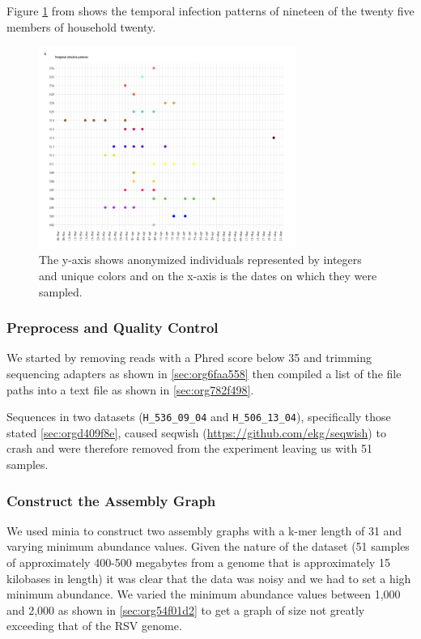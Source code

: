 \documentclass[10pt, a4paper]{article}
\begin{document}
Figure \ref{fig:orgbba1b9e} from
\cite{githinjiAssessingUtilityMinority2018} shows the temporal infection patterns
of nineteen of the twenty five members of household twenty.

\begin{figure}[h]
\centering
\includegraphics[width=0.75\textwidth]{../Figures/RSV/Githinji_HH_5_temporal_distribution.png}
\caption[Temporal Distribution of RSV Sample Collection]{\label{fig:orgbba1b9e}The y-axis shows anonymized individuals represented by integers and unique colors and on the x-axis is the dates on which they were sampled.}
\end{figure}

\subsubsection{Preprocess and Quality Control}
\label{sec:org2b20197}
We started by removing reads with a Phred score below 35 and trimming sequencing
adapters as shown in \ref{sec:org6faa558} then compiled a list 
of the file paths into a text file as shown in \ref{sec:org782f498}.

Sequences in two datasets (\texttt{H\_536\_09\_04} and \texttt{H\_506\_13\_04}), specifically those 
stated \ref{sec:orgd409f8e}, caused seqwish
(\url{https://github.com/ekg/seqwish}) to crash and were therefore removed from the 
experiment leaving us with 51 samples.

\subsubsection{Construct the Assembly Graph}
\label{sec:orgaf2a392}
We used minia \cite{chikhiSpaceefficientExactBruijn2013} to construct two assembly
graphs with a k-mer length of 31 and varying minimum abundance values.
Given the nature of the dataset (51 samples of approximately 400-500 megabytes 
from a genome that is approximately 15 kilobases in length) it was clear 
that the data was noisy and we had to set a high minimum abundance. 
We varied the minimum abundance values between 1,000 and 2,000 as shown 
in \ref{sec:org54f01d2} to get a graph of size not greatly exceeding that of
the RSV genome.
\end{document}

